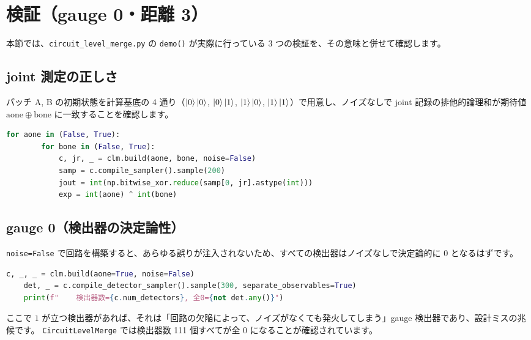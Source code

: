 \section{検証（gauge 0・距離 3）}\label{sec:verify_merge}

本節では、\texttt{circuit\_level\_merge.py} の \texttt{demo()} が実際に行っている 3 つの検証を、その意味と併せて確認します。

\subsection*{joint 測定の正しさ}

パッチ A, B の初期状態を計算基底の 4 通り（$\ket{0}\ket{0}$, $\ket{0}\ket{1}$, $\ket{1}\ket{0}$, $\ket{1}\ket{1}$）で用意し、ノイズなしで joint 記録の排他的論理和が期待値 $\mathrm{aone}\oplus\mathrm{bone}$ に一致することを確認します。

\begin{lstlisting}[language=Python, caption={joint 測定の正しさの検証（\codepath{src/stages/02_circuit_level/src/ftqc/circuit_level_merge.py}）}]
    for aone in (False, True):
        for bone in (False, True):
            c, jr, _ = clm.build(aone, bone, noise=False)
            samp = c.compile_sampler().sample(200)
            jout = int(np.bitwise_xor.reduce(samp[0, jr].astype(int)))
            exp = int(aone) ^ int(bone)
\end{lstlisting}

\subsection*{gauge 0（検出器の決定論性）}

\texttt{noise=False} で回路を構築すると、あらゆる誤りが注入されないため、すべての検出器はノイズなしで決定論的に $0$ となるはずです。

\begin{lstlisting}[language=Python, caption={gauge 0 の検証（\codepath{src/stages/02_circuit_level/src/ftqc/circuit_level_merge.py}）}]
    c, _, _ = clm.build(aone=True, noise=False)
    det, _ = c.compile_detector_sampler().sample(300, separate_observables=True)
    print(f"    検出器数={c.num_detectors}, 全0={not det.any()}")
\end{lstlisting}

ここで $1$ が立つ検出器があれば、それは「回路の欠陥によって、ノイズがなくても発火してしまう」gauge 検出器であり、設計ミスの兆候です。
\texttt{CircuitLevelMerge} では検出器数 111 個すべてが全 0 になることが確認されています。

